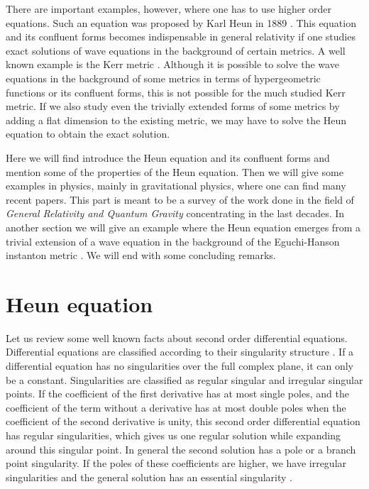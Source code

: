 \documentclass{article}
\begin{document}
\noindent There are important examples, however, where one has to
use higher order equations. Such an equation was  proposed by Karl
Heun in 1889 \cite {Heun}. This equation and its confluent forms
becomes indispensable in general relativity if one studies exact
solutions of  wave equations in the background of certain metrics.
A well known example is the Kerr metric \cite {Kerr}. Although it
is possible to solve the wave equations in the background of some
metrics in terms of hypergeometric functions or its confluent
forms, this is not possible for the much studied  Kerr metric. If
we also study even the trivially extended forms of some metrics by
adding a flat dimension to the existing metric, we may have to
solve the Heun equation to obtain the exact solution.

\noindent  Here we will find introduce the Heun equation and its
confluent forms and  mention some of the properties of the Heun
equation. Then we will give some examples in physics, mainly in
gravitational physics, where one can find many recent papers. This
part is  meant to be a survey of the work done  in the field of
\emph{General Relativity and Quantum Gravity} concentrating in the
last decades.  In another section we will give an example where
the Heun equation emerges from a trivial extension of a wave
equation in the background of the Eguchi-Hanson instanton metric
\cite {Eguchi}. We will end with some concluding remarks.


\section{Heun equation}
 Let us review some well known
facts about second order differential equations. Differential
equations are classified according to their singularity structure
\cite {Morse1,Ince}. If a differential equation has no
singularities over the full complex plane, it can only be a
constant. Singularities are classified as regular singular and
irregular singular points. If the coefficient of the first
derivative has at most single poles, and the coefficient of the
term without a derivative has at most double poles when the
coefficient of the second derivative is unity, this second order
differential equation has regular singularities, which gives us
one regular solution while expanding around this singular point.
In general the second solution has a  pole or a 
branch point singularity. If
the poles of these coefficients are higher, we have  irregular
singularities and the general solution has an essential
singularity \cite {Morse2}.
\end{document}
